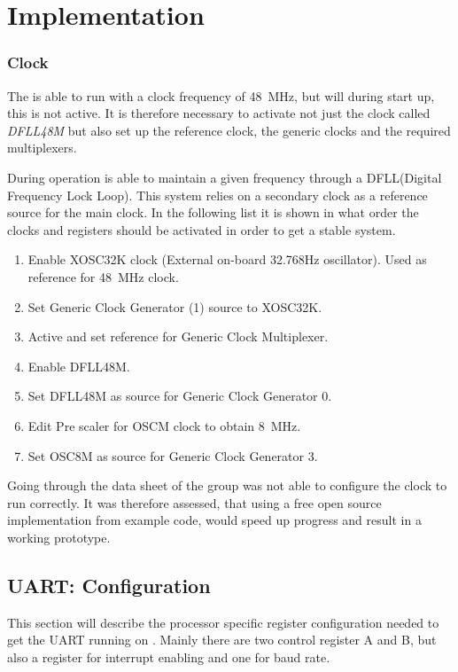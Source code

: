 
\chapter{Implementation}
\subsection{Clock}
The \SAMD is able to run with a clock frequency of \SI{48}{\mega\hertz}, but will during start up, this is not active. It is therefore necessary to activate not just the clock called \textit{DFLL48M} but also set up the reference clock, the generic clocks and the required multiplexers.

During operation \SAMD is able to maintain a given frequency through a DFLL(Digital Frequency Lock Loop).
This system relies on a secondary clock as a reference source for the main clock.
In the following list it is shown in what order the clocks and registers should be activated in order to get a stable system.

\begin{enumerate}
	\item Enable XOSC32K clock (External on-board 32.768Hz oscillator). Used as reference for \SI{48}{\mega\hertz} clock.
	\item Set Generic Clock Generator (1) source to XOSC32K.
	\item Active and set reference for Generic Clock Multiplexer.
	\item Enable DFLL48M.
	\item Set DFLL48M as source for Generic Clock Generator 0.
	\item Edit Pre scaler for OSCM clock to obtain \SI{8}{\mega\hertz}.
	\item Set OSC8M as source for Generic Clock Generator 3.
\end{enumerate} 

Going through the data sheet of \SAMD the group was not able to configure the clock to run correctly. It was therefore assessed, that using a free open source implementation from example code, would speed up progress and result in a working prototype.

\section{UART: Configuration}
This section will describe the processor specific register configuration needed to get the UART running on \SAMD. Mainly there are two control register A and B, but also a register for interrupt enabling and one for baud rate.

